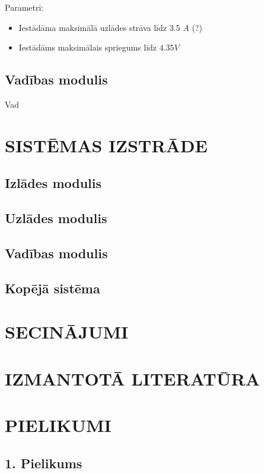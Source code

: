 \documentclass[12pt,fleqn,titlepage,oneside]{article}
\numberwithin{equation}{section}
\numberwithin{figure}{section}
\numberwithin{table}{section}
\begin{document}
Parametri:
\begin{itemize}
	\item Iestādāma maksimālā uzlādes strāva līdz 3.5 $A$ (?) %
	\item Iestādāms maksimālais spriegums līdz $4.35 V$
\end{itemize}

\subsection{Vadības modulis}

Vad

\FloatBarrier
\newpage
\section{\texorpdfstring{\MakeUppercase{Sistēmas izstrāde}}{Sistēmas izstrāde}}

\subsection{Izlādes modulis}

\subsection{Uzlādes modulis}

\subsection{Vadības modulis}

\subsection{Kopējā sistēma}

\FloatBarrier
\newpage
\section{\texorpdfstring{\MakeUppercase{Secinājumi}}{Secinājumi}}

\FloatBarrier
\newpage

\section*{\texorpdfstring{\MakeUppercase{Izmantotā literatūra}}{Izmantotā literatūra}}
\printbibliography[heading=none]

\FloatBarrier
\newpage
\vspace*{\fill}

\section*{\centering\texorpdfstring{\MakeUppercase{Pielikumi}}{Pielikumi}}

\vspace*{\fill}
\FloatBarrier
\newpage

\subsection*{1. Pielikums}
\end{document}
